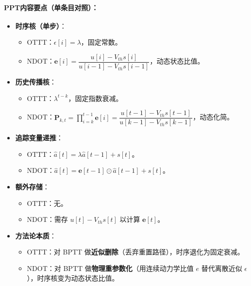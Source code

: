 \documentclass[journal,12pt,onecolumn]{IEEEtran}
\begin{document}
\paragraph{\textbf{PPT内容要点（单条目对照）：}}
\begin{itemize}
    \item \textbf{时序核（单步）}：
    \begin{itemize}
        \item OTTT：\(\epsilon[i] = \lambda\)，固定常数。
        \item NDOT：\(\mathbf{e}[i] = \dfrac{u[i] - V_{th}s[i]}{u[i-1] - V_{th}s[i-1]}\)，动态状态比值。
    \end{itemize}
    
    \item \textbf{历史传播核}：
    \begin{itemize}
        \item OTTT：\(\lambda^{t-k}\)，固定指数衰减。
        \item NDOT：\(\mathbf{P}_{k,t} = \prod_{i=k}^{t-1} \mathbf{e}[i] = \dfrac{u[t-1] - V_{th}s[t-1]}{u[k-1] - V_{th}s[k-1]}\)，动态化简。
    \end{itemize}
    
    \item \textbf{追踪变量递推}：
    \begin{itemize}
        \item OTTT：\(\hat{a}[t] = \lambda \hat{a}[t-1] + s[t]\)。
        \item NDOT：\(\hat{a}[t] = \mathbf{e}[t-1] \odot \hat{a}[t-1] + s[t]\)。
    \end{itemize}
    
    \item \textbf{额外存储}：
    \begin{itemize}
        \item OTTT：无。
        \item NDOT：需存 \(u[t] - V_{th}s[t]\) 以计算 \(\mathbf{e}[t]\)。
    \end{itemize}
    
    \item \textbf{方法论本质}：
    \begin{itemize}
        \item OTTT：对 BPTT 做\textbf{近似删除}（丢弃重置路径），时序退化为固定衰减。
        \item NDOT：对 BPTT 做\textbf{物理重参数化}（用连续动力学比值 \(e\) 替代离散近似 \(\epsilon\)），时序核变为动态状态比值。
    \end{itemize}
\end{itemize}
\end{document}
